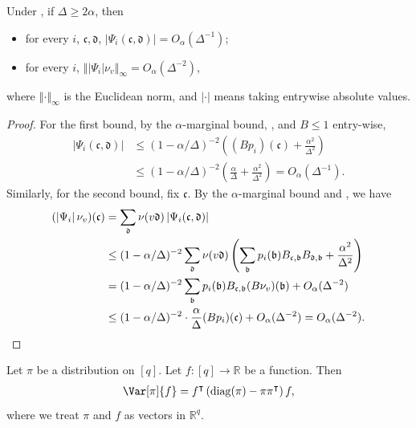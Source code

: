 \documentclass[a4paper,12pt]{article}
\theoremstyle{plain}
\theoremstyle{definition}
\def\!#1{\mathfrak{#1}} %
\def\!#1{\mathfrak{#1}} %
\newcommand{\norm}[1]{\left\Vert#1\right\Vert}
\newcommand{\tuple}[1]{\left(#1\right)}
\newcommand{\tp}{\tuple}
\newcommand{\abs}[1]{\left\vert#1\right\vert}
\begin{document}
\begin{corollary} \label{cor:Psi-related-bounds}
  Under , if $\Delta\geq2\alpha$, then
  \begin{itemize}
  \item for every $i$, $\!c,\!d$, $\abs{\Psi_i(\!c,\!d)} = O_\alpha(\Delta^{-1})$;
  \item for every $i$, $\norm{\abs{\Psi_i} \nu_v}_\infty = O_{\alpha}(\Delta^{-2})$,
  \end{itemize}
  where $\norm{\cdot}_\infty$ is the Euclidean norm, and $\abs{\cdot}$ means taking entrywise absolute values.
\end{corollary}
\begin{proof}
  For the first bound, by the $\alpha$-marginal bound, , and $B \leq 1$ entry-wise, %
  \begin{align*}
    \abs{\Psi_i(\!c,\!d)}
    &\leq (1-\alpha/\Delta)^{-2}\tp{(Bp_i)(\!c) + \frac{\alpha^2}{\Delta^2}} \\
    &\leq (1-\alpha/\Delta)^{-2}\tp{\frac{\alpha}{\Delta} + \frac{\alpha^2}{\Delta^2}} = O_\alpha(\Delta^{-1}).
  \end{align*}
  Similarly, for the second bound, fix $\!c$. By the $\alpha$-marginal bound and , we have
  \begin{align*}
    (\abs{\Psi_i} \nu_v)(\!c)
    &= \sum_{\!d} \nu(v\!d)\abs{\Psi_i(\!c,\!d)} \\
    &\leq (1-\alpha/\Delta)^{-2}\sum_{\!d} \nu(v\!d)\tp{\sum_{\!b}p_i(\!b)B_{\!c,\!b}B_{\!d,\!b} + \frac{\alpha^2}{\Delta^2}} \\
    &=(1-\alpha/\Delta)^{-2} \sum_{\!b}p_i(\!b)B_{\!c,\!b} (B\nu_v)(\!b) + O_\alpha(\Delta^{-2}) \\
    &\leq (1-\alpha/\Delta)^{-2} \cdot \frac{\alpha}{\Delta} (Bp_i)(\!c) + O_\alpha(\Delta^{-2}) = O_\alpha(\Delta^{-2}). \qedhere
  \end{align*}
\end{proof}

\begin{fact}\label{fact:var-matrix-form}
  Let $\pi$ be a distribution on $[q]$.
  Let $f:[q] \to \mathbb{R}$ be a function.
  Then
  \begin{align*}
    \Var[\pi]{f} = f^\intercal \tp{\mathrm{diag}(\pi) - \pi\pi^\intercal} f,
  \end{align*}
  where we treat $\pi$ and $f$ as vectors in $\mathbb{R}^q$.
\end{fact}
\end{document}
